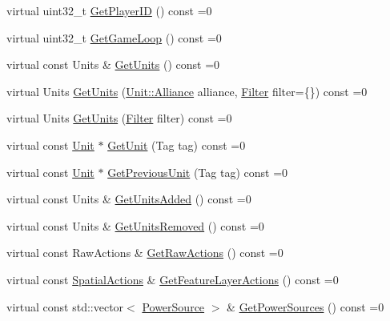 \begin{DoxyCompactItemize}
\item 
virtual uint32\+\_\+t \hyperlink{classsc2_1_1_observation_interface_a21c3f197fe6578e63ef6b2eaa2be082c}{Get\+Player\+ID} () const =0
\item 
virtual uint32\+\_\+t \hyperlink{classsc2_1_1_observation_interface_a19d85546124654418d00b736f0146218}{Get\+Game\+Loop} () const =0
\item 
virtual const Units \& \hyperlink{classsc2_1_1_observation_interface_ab08e71ba04b19d3b4048ce9da6838e00}{Get\+Units} () const =0
\item 
virtual Units \hyperlink{classsc2_1_1_observation_interface_aa43cfa17a9ac893500bce33eb41e6171}{Get\+Units} (\hyperlink{classsc2_1_1_unit_a5a40e672e7599d73ef8ef5758bbd7461}{Unit\+::\+Alliance} alliance, \hyperlink{sc2__interfaces_8h_a5cc3d9751182ccd2b085f3e272bcc88b}{Filter} filter=\{\}) const =0
\item 
virtual Units \hyperlink{classsc2_1_1_observation_interface_ab0d22edc6bd276b8e9d27387294fdc88}{Get\+Units} (\hyperlink{sc2__interfaces_8h_a5cc3d9751182ccd2b085f3e272bcc88b}{Filter} filter) const =0
\item 
virtual const \hyperlink{classsc2_1_1_unit}{Unit} $\ast$ \hyperlink{classsc2_1_1_observation_interface_a0f766e5a6522a6966b4d2abf0a2daff2}{Get\+Unit} (Tag tag) const =0
\item 
virtual const \hyperlink{classsc2_1_1_unit}{Unit} $\ast$ \hyperlink{classsc2_1_1_observation_interface_a59684d8b385941931e6175800eb4bbdb}{Get\+Previous\+Unit} (Tag tag) const =0
\item 
virtual const Units \& \hyperlink{classsc2_1_1_observation_interface_a30cdffc5d5c87797c5c154fe50bad768}{Get\+Units\+Added} () const =0
\item 
virtual const Units \& \hyperlink{classsc2_1_1_observation_interface_a656f51b87f1fafeeff37206345793476}{Get\+Units\+Removed} () const =0
\item 
virtual const Raw\+Actions \& \hyperlink{classsc2_1_1_observation_interface_aa247d650d50d3d1bfe81642df96b1360}{Get\+Raw\+Actions} () const =0
\item 
virtual const \hyperlink{structsc2_1_1_spatial_actions}{Spatial\+Actions} \& \hyperlink{classsc2_1_1_observation_interface_a1e0b5b6e6e6ce0a879c1854b696dcdb0}{Get\+Feature\+Layer\+Actions} () const =0
\item 
virtual const std\+::vector$<$ \hyperlink{structsc2_1_1_power_source}{Power\+Source} $>$ \& \hyperlink{classsc2_1_1_observation_interface_abf25ada67444ace346e57c1ad367ca8e}{Get\+Power\+Sources} () const =0

\end{DoxyCompactItemize}
